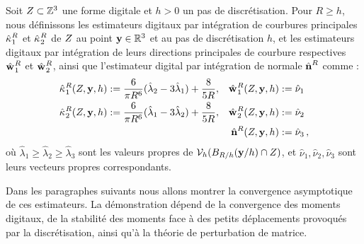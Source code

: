 \begin{definition}
  \label{def:principal-curv-estimators}
%
  Soit $Z \subset \mathbb{Z}^3$ une forme digitale et $h > 0$ un pas de
  discrétisation. Pour $R \ge h$, nous définissons les estimateurs digitaux par
  intégration de courbures principales $\hat{\kappa_{}}_{1}^{R}$ et
  $\hat{\kappa_{}}_{2}^{R}$ de $Z$ au point $\mathbf{y} \in \mathbb{R}^3$ et au pas de
  discrétisation $h$, et les estimateurs digitaux par intégration de leurs
  directions principales de courbure respectives $\hat{\mathbf{w}_{}}_{1}^{R}$ et
  $\hat{\mathbf{w}_{}}_{2}^{R}$, ainsi que l'estimateur digital par intégration de normale
  $\hat{\mathbf{n}{}}^{R}$ comme :
%
\begin{align}
  \hat{\kappa_{}}_{1}^{R}(Z,\mathbf{y},h)  &:= \frac{6}{\pi R^6}(\hat{\lambda}_2 - 3\hat{\lambda}_1) + \frac{8}{5R},
  &\hat{\mathbf{w}_{}}_{1}^{R}(Z,\mathbf{y},h) &:= \hat{\nu}_1 \\
  \hat{\kappa_{}}_{2}^{R}(Z,\mathbf{y},h) &:= \frac{6}{\pi R^6}(\hat{\lambda}_1 - 3\hat{\lambda}_2) + \frac{8}{5R},
  &\hat{\mathbf{w}_{}}_{2}^{R}(Z,\mathbf{y},h) &:= \hat{\nu}_2\\
  & &\hat{\mathbf{n}{}}^{R}(Z,\mathbf{y},h) &:=\hat{\nu}_3\,,
\end{align}
%
où $\hat{\lambda}_1 \ge \hat{\lambda}_2 \ge \hat{\lambda}_3$ sont les valeurs
propres de $\mathcal{V}_{h}(B_{R/h}(\mathbf{y} / h) \cap Z)$, et $\hat{\nu}_1,
\hat{\nu}_2, \hat{\nu}_3$ sont leurs vecteurs propres correspondants.
%
\end{definition}
%
Dans les paragraphes suivants nous allons montrer la convergence asymptotique de
ces estimateurs. La démonstration dépend de la convergence des moments digitaux,
de la stabilité des moments face à des petits déplacements provoqués par la
discrétisation, ainsi qu'à la théorie de perturbation de matrice.
%
